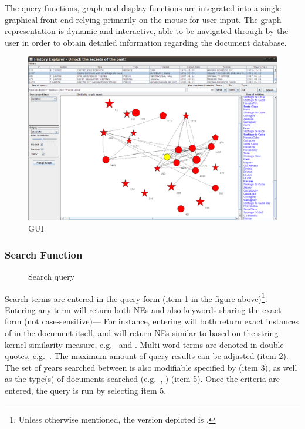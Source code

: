 The query functions, graph and display functions are integrated into a single graphical front-end
relying primarily on the mouse for user input. The graph representation is dynamic and interactive,
able to be navigated through by the user in order to obtain detailed information regarding the
document database.
\begin{figure}[ht]
\centering
\caption{GUI}
\includegraphics[width=160mm]{gui.png}
\end{figure}

\subsubsection{Search Function}
\begin{figure}[ht]
\centering
\caption{Search query}
\end{figure}

Search terms are entered in the query form (item 1 in the figure above)\footnote{Unless
otherwise mentioned, the version depicted is .}: Entering any term will return both
NEs and also keywords sharing the exact form (not case-sensitive)--- For instance, entering
 will both return exact instances of  in the document itself,
and will return NEs similar to  based on the string kernel similarity measure,
e.g.\  and .
Multi-word terms are denoted in double quotes, e.g.\ . The maximum amount
of query results can be adjusted (item 2). The set of years searched between is also modifiable
specified by (item 3), as well as the type(s) of documents searched (e.g.\ ,
) (item 5). Once the criteria are entered, the query is run by selecting item 5.

